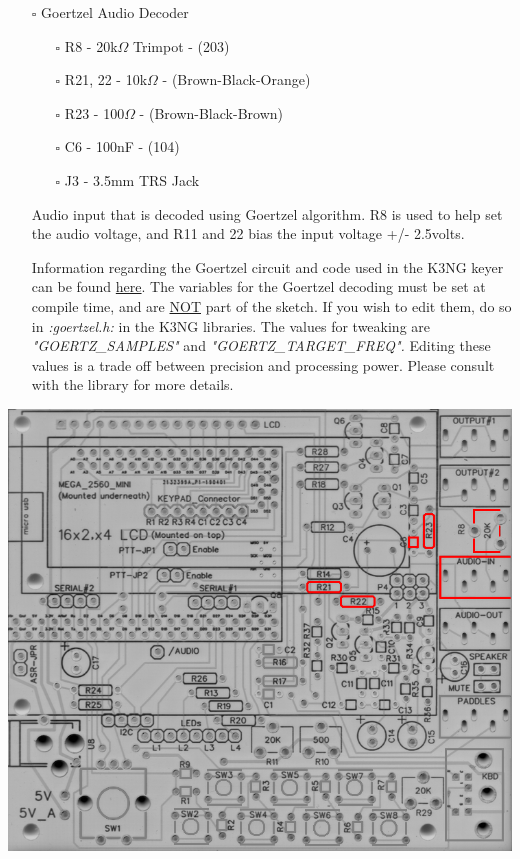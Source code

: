 \documentclass[11pt]{article}
\begin{document}
\newpage
\begin{itemize}
\item[{$\square$}] Goertzel Audio Decoder
\begin{itemize}
\item[{$\square$}] R8 - 20k\(\Omega\) Trimpot - (203)
\item[{$\square$}] R21, 22 - 10k\(\Omega\) - (Brown-Black-Orange)
\item[{$\square$}] R23 - 100\(\Omega\) - (Brown-Black-Brown)
\item[{$\square$}] C6 - 100nF - (104)
\item[{$\square$}] J3 - 3.5mm TRS Jack
\end{itemize}

Audio input that is decoded using Goertzel algorithm.  R8 is used to help set the audio voltage, and R11 and 22 bias the input voltage +/- 2.5volts.

Information regarding the Goertzel circuit and code used in the K3NG keyer can be found \href{http://skovholm.com/cwdecoder}{here}.  The variables for the Goertzel decoding must be set at compile time, and are \uline{NOT} part of the sketch.  If you wish to edit them, do so in \emph{:goertzel.h:} in the K3NG libraries.  The values for tweaking are \emph{"GOERTZ\_SAMPLES"} and \emph{"GOERTZ\_TARGET\_FREQ".}  Editing these values is a trade off between precision and processing power.  Please consult with the library for more details.
\end{itemize}
\begin{center}
\includegraphics[width=.9\linewidth]{../png/3.2/pcb-top-goertzel-filter.png}
\end{center}
\end{document}
